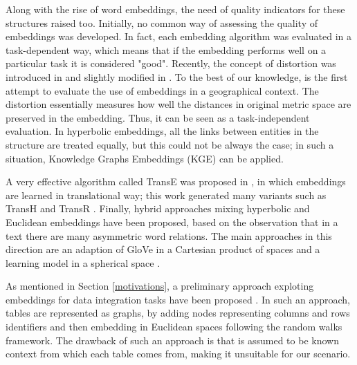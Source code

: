 Along with the rise of word embeddings, the need of quality indicators for these structures raised too. 
Initially, no common way of assessing the quality of embeddings was developed. 
In fact, each embedding algorithm was evaluated in a task-dependent way, which means that if the embedding performs well on a particular task it is considered "good". 
Recently, the concept of distortion was introduced in \cite{sala2018representation} and slightly modified in \cite{dassereto2019evaluating}. 
To the best of our knowledge, \cite{dassereto2019evaluating} is the first attempt to evaluate the use of embeddings in a geographical context. 
The distortion essentially measures how well the distances in original metric space are preserved in the embedding. Thus, it can be seen as a task-independent evaluation. In hyperbolic embeddings, all the links between entities in the structure are treated equally, but this could not be always the case; in such a situation, Knowledge Graphs Embeddings (KGE) can be applied. 

A very effective algorithm called TransE was proposed in \cite{bordes2013translating}, in which embeddings are learned in translational way; this work generated many variants such as TransH \cite{wang2014knowledge} and TransR \cite{lin2015learning}. 
Finally, hybrid approaches mixing hyperbolic and Euclidean embeddings have been proposed, based on the observation that in a text there are many asymmetric word relations. The main approaches in this direction are an adaption of GloVe in a Cartesian product of spaces \cite{tifrea2018poincare} and a learning model in a spherical space \cite{meng2019spherical}.  

As mentioned in Section \ref{motivations}, a preliminary approach exploting embeddings for data integration tasks have been proposed \cite{cappuzzo2020creating}. In such an approach, tables are represented as graphs, by adding nodes representing columns and rows identifiers and then embedding in Euclidean spaces following the random walks framework. The drawback of such an approach is that is assumed to be known context from which each table comes from, making it unsuitable for our scenario.


